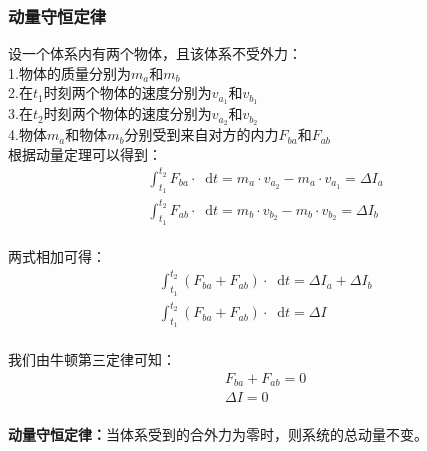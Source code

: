 \documentclass[UTF8]{ctexart}
\newcommand*{\dif}{\mathop{}\!\mathrm{d}}
\begin{document}
\subsubsection{动量守恒定律}
    设一个体系内有两个物体，且该体系不受外力：\\[3mm]
    1.物体的质量分别为$m_a$和$m_b$\\[2mm]
    2.在$t_1$时刻两个物体的速度分别为$v_{a_1}$和$v_{b_1}$\\[2mm]
    3.在$t_2$时刻两个物体的速度分别为$v_{a_2}$和$v_{b_2}$\\[2mm]
    4.物体$m_a$和物体$m_b$分别受到来自对方的内力$F_{ba}$和$F_{ab}$\\[4mm]
    根据动量定理可以得到：
    \setcounter{equation}{0}
    \begin{align}
        &\int_{t_1}^{t_2}F_{ba}\cdot \dif t=m_a\cdot v_{a_2}-m_a\cdot v_{a_1}=\Delta I_a\\[4mm]
        &\int_{t_1}^{t_2}F_{ab}\cdot \dif t=m_b\cdot v_{b_2}-m_b\cdot v_{b_2}=\Delta I_b
    \end{align}\\
    两式相加可得：
    \begin{align}
        &\int_{t_1}^{t_2}\left(F_{ba}+F_{ab}\right)\cdot\dif t=\Delta I_a+\Delta I_b\\[4mm]
        &\int_{t_1}^{t_2}\left(F_{ba}+F_{ab}\right)\cdot\dif t=\Delta I
    \end{align}\\
    我们由牛顿第三定律可知：
    \begin{align}
        &F_{ba}+F_{ab}=0\\[3mm]
        &\Delta I=0
    \end{align}\\
    \textbf{动量守恒定律：}当体系受到的合外力为零时，则系统的总动量不变。

\newpage
\end{document}

